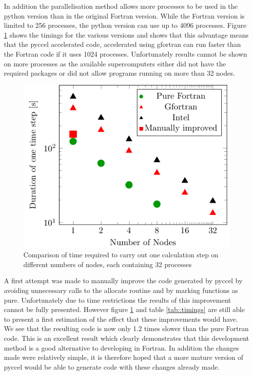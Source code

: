 In addition the parallelisation method allows more processes to be used in the python version than in the original Fortran version. While the Fortran version is limited to 256 processes, the python version can use up to 4096 processes. Figure \ref{fig::Timing Comparison} shows the timings for the various versions and shows that this advantage means that the pyccel accelerated code, accelerated using gfortran can run faster than the Fortran code if it uses 1024 processes. Unfortunately results cannot be shown on more processes as the available supercomputers either did not have the required packages or did not allow programs running on more than 32 nodes.

\begin{figure}[ht]
 \centering
 \includegraphics[width=.7\textwidth]{Figs/PythonScaling/Speeds}
 \caption{\label{fig::Timing Comparison}Comparison of time required to carry out one calculation step on different numbers of nodes, each containing 32 processes }
\end{figure}

A first attempt was made to manually improve the code generated by pyccel by avoiding unnecessary calls to the allocate routine and by marking functions as pure. Unfortunately due to time restrictions the results of this improvement cannot be fully presented. However figure \ref{fig::Timing Comparison} and table \ref{tab::timings} are still able to present a first estimation of the effect that these improvements would have. We see that the resulting code is now only 1.2 times slower than the pure Fortran code. This is an excellent result which clearly demonstrates that this development method is a good alternative to developing in Fortran. In addition the changes made were relatively simple, it is therefore hoped that a more mature version of pyccel would be able to generate code with these changes already made.

